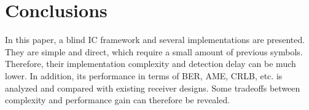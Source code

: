 \documentclass[conference]{IEEEtran}
\begin{document}
\section{Conclusions}
In this paper, a blind IC framework and several implementations
are presented. They are simple and direct, which require a small
amount of previous symbols. Therefore, their implementation
complexity and detection delay can be much lower. In addition, its
performance in terms of BER, AME, CRLB, etc. is analyzed and
compared with existing receiver designs. Some tradeoffs between
complexity and performance gain can therefore be revealed.

\small

\small

\end{document}
